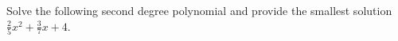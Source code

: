 Solve the following second degree polynomial and provide the smallest solution  $\frac{2}{5}x^2 + \frac{3}{7}x + 4$.